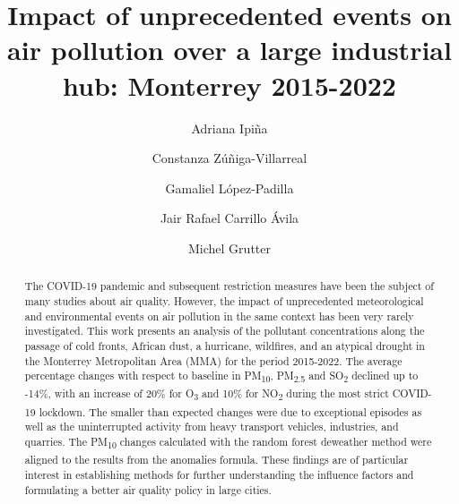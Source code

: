 \documentclass[preprint,12pt]{elsarticle}
\begin{document}
\begin{frontmatter}
	\title{
		Impact of unprecedented events on air pollution over a large industrial hub: Monterrey 2015-2022
	}
	\author[1]{Adriana Ipiña}
	\author[2]{Constanza Zúñiga-Villarreal}
	\author[3]{Gamaliel López-Padilla}
	\author[4]{Jair Rafael Carrillo Ávila}
	\author[5]{Michel Grutter}
	\vspace{-1em}
	\begin{abstract}
		The COVID-19 pandemic and subsequent restriction measures have been the subject of many studies about air quality. However, the impact of unprecedented meteorological and environmental events on air pollution in the same context has been very rarely investigated. This work presents an analysis of the pollutant concentrations along the passage of cold fronts, African dust, a hurricane, wildfires, and an atypical drought in the Monterrey Metropolitan Area (MMA) for the period 2015-2022. The average percentage changes with respect to baseline in PM\textsubscript{10}, PM\textsubscript{2.5} and SO\textsubscript{2} declined up to -14\%, with an increase of 20\% for O\textsubscript{3} and 10\% for NO\textsubscript{2} during the most strict COVID-19 lockdown. The smaller than expected changes were due to exceptional episodes as well as the uninterrupted activity from heavy transport vehicles, industries, and quarries. The PM\textsubscript{10} changes calculated with the random forest deweather method were aligned to the results from the anomalies formula. These findings are of particular interest in establishing methods for further understanding the influence factors and formulating a better air quality policy in large cities.%

\end{abstract}
\end{frontmatter}
\end{document}
